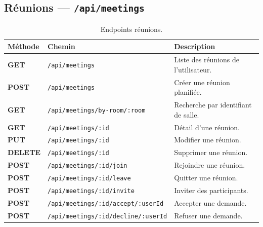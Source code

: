 \documentclass[11pt,a4paper,oneside]{report}
\newcommand{\mGET}{\textcolor{codeStr}{\textbf{GET}}}
\newcommand{\mPOST}{\textcolor{AlanyaIndigoStrong}{\textbf{POST}}}
\newcommand{\mPUT}{\textcolor{warning}{\textbf{PUT}}}
\newcommand{\mDEL}{\textcolor{danger}{\textbf{DELETE}}}
\newcommand{\thd}[1]{\textbf{\textcolor{AlanyaIndigoDark}{#1}}}
\begin{document}
\subsection{R\'{e}unions --- \texttt{/api/meetings}}
\begin{table}[H]
\centering
\begin{tabularx}{\linewidth}{@{}l p{6.6cm} X@{}}
\toprule
\thd{M\'{e}thode} & \thd{Chemin} & \thd{Description}\\
\midrule
\mGET  & \texttt{/api/meetings} & Liste des r\'{e}unions de l'utilisateur.\\
\mPOST & \texttt{/api/meetings} & Cr\'{e}er une r\'{e}union planifi\'{e}e.\\
\mGET  & \texttt{/api/meetings/by-room/:room} & Recherche par identifiant de salle.\\
\mGET  & \texttt{/api/meetings/:id} & D\'{e}tail d'une r\'{e}union.\\
\mPUT  & \texttt{/api/meetings/:id} & Modifier une r\'{e}union.\\
\mDEL  & \texttt{/api/meetings/:id} & Supprimer une r\'{e}union.\\
\mPOST & \texttt{/api/meetings/:id/join} & Rejoindre une r\'{e}union.\\
\mPOST & \texttt{/api/meetings/:id/leave} & Quitter une r\'{e}union.\\
\mPOST & \texttt{/api/meetings/:id/invite} & Inviter des participants.\\
\mPOST & \texttt{/api/meetings/:id/accept/:userId} & Accepter une demande.\\
\mPOST & \texttt{/api/meetings/:id/decline/:userId} & Refuser une demande.\\
\bottomrule
\end{tabularx}
\caption{Endpoints r\'{e}unions.}
\end{table}
\end{document}
